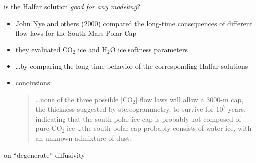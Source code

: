 \documentclass[titlepage,letterpaper,final,11pt]{scrartcl}
\newcommand{\grad}{\nabla}
\newcommand{\Div}{\nabla\cdot}
\begin{document}
is the Halfar solution \emph{good for any modeling}?

\begin{itemize}
\item John Nye and others (2000)\nocite{NyeIcarus2000} compared the long-time consequences of different flow laws for the South Mars Polar Cap
\item they evaluated $\text{CO}_2$ ice and $\text{H}_2\text{O}$ ice softness parameters
\item \dots by comparing the long-time behavior of the corresponding Halfar solutions
\item conclusions:
  \begin{quote}
  \dots none of the three possible [$\text{CO}_2$] flow laws will allow a 3000-m cap, the thickness suggested by stereogrammetry, to survive for $10^7$ years, indicating that the south polar ice cap is probably not composed of pure $\text{CO}_2$ ice \dots the south polar cap probably consists of water ice, with an unknown admixture of dust.
  \end{quote}
\end{itemize}

on ``degenerate'' diffusivity

\end{document}
